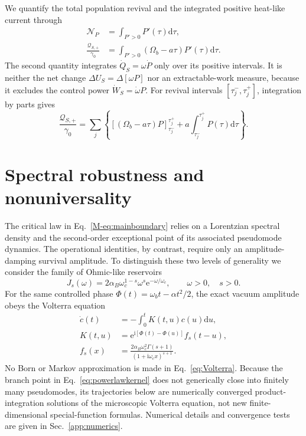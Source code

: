 \documentclass[reprint,superscriptaddress,floatfix,amsmath,amssymb,prresearch,aps]{revtex4-2}
\newcommand{\dd}{\mathrm{d}}
\newcommand{\ee}{\mathrm{e}}
\newcommand{\ii}{\mathrm{i}}
\begin{document}
We quantify the total population revival and the integrated positive
heat-like current through
\begin{align}
\mathcal N_P&=\int_{P'>0}P'(\tau)\dd\tau,
\label{eq:NP}\\
\frac{\mathcal Q_{S,+}}{\gamma_0}
&=\int_{P'>0}(\Omega_b-a\tau)P'(\tau)\dd\tau.
\label{eq:Eback}
\end{align}
The second quantity integrates \(\dot Q_S=\omega\dot P\) only over its
positive intervals. It is neither the net change
\(\Delta U_S=\Delta[\omega P]\) nor an extractable-work measure, because it
excludes the control power \(\dot W_S=\dot\omega P\).
For revival intervals \([\tau_j^-,\tau_j^+]\), integration by parts gives
\begin{equation}
\frac{\mathcal Q_{S,+}}{\gamma_0}
=\sum_j\left\{
[(\Omega_b-a\tau)P]_{\tau_j^-}^{\tau_j^+}
+a\int_{\tau_j^-}^{\tau_j^+}P(\tau)\dd\tau
\right\}.
\label{eq:Ebackparts}
\end{equation}


\section{Spectral robustness and nonuniversality}
\label{sec:powerlaw}

The critical law in Eq.~\eqref{M-eq:mainboundary} relies on a Lorentzian
spectral density and the second-order exceptional point of its associated
pseudomode dynamics. The operational identities, by contrast,
require only an amplitude-damping survival amplitude. To distinguish these
two levels of generality we consider the family of Ohmic-like reservoirs
\begin{equation}
J_s(\omega)=2\alpha_B\omega_c^{1-s}\omega^s
\ee^{-\omega/\omega_c},
\qquad \omega>0,\quad s>0.
\label{eq:powerlawdensity}
\end{equation}
For the same controlled phase
\(\Phi(t)=\omega_bt-\alpha t^2/2\), the exact vacuum amplitude obeys the
Volterra equation
\begin{align}
\dot c(t)&=-\int_0^tK(t,u)c(u)\dd u,
\label{eq:Volterra}\\
K(t,u)&=\ee^{\ii[\Phi(t)-\Phi(u)]}f_s(t-u),\nonumber\\
f_s(x)&=\frac{2\alpha_B\omega_c^2\Gamma(s+1)}
{(1+\ii\omega_c x)^{s+1}}.
\label{eq:powerlawkernel}
\end{align}
No Born or Markov approximation is made in Eq.~\eqref{eq:Volterra}. Because the branch point in
Eq.~\eqref{eq:powerlawkernel} does not generically close into finitely many
pseudomodes, its trajectories below are numerically converged
product-integration solutions of the microscopic Volterra equation, not new
finite-dimensional special-function formulas. Numerical details and
convergence tests are given in Sec.~\ref{app:numerics}.
\end{document}
